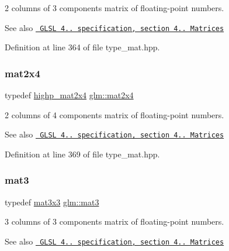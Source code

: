 2 columns of 3 components matrix of floating-\/point numbers.

\begin{DoxySeeAlso}{See also}
\href{http://www.opengl.org/registry/doc/GLSLangSpec.4.20.8.pdf}{\texttt{ G\+L\+SL 4.. specification, section 4.. Matrices}} 
\end{DoxySeeAlso}


Definition at line 364 of file type\+\_\+mat.\+hpp.

\mbox{\label{group__core__types_gaa9bfb36efaf88ecad32369ec8a01d901}} 
\subsubsection{\texorpdfstring{mat2x4}{mat2x4}}
{\footnotesize\ttfamily typedef \mbox{\hyperlink{group__core__precision_ga74ae75c71c8c2b775714fb24454d6096}{highp\+\_\+mat2x4}} \mbox{\hyperlink{group__core__types_gaa9bfb36efaf88ecad32369ec8a01d901}{glm\+::mat2x4}}}

2 columns of 4 components matrix of floating-\/point numbers.

\begin{DoxySeeAlso}{See also}
\href{http://www.opengl.org/registry/doc/GLSLangSpec.4.20.8.pdf}{\texttt{ G\+L\+SL 4.. specification, section 4.. Matrices}} 
\end{DoxySeeAlso}


Definition at line 369 of file type\+\_\+mat.\+hpp.

\mbox{\label{group__core__types_gadfaff2a7dce5cbf4e77a47ecea42ac5b}} 
\subsubsection{\texorpdfstring{mat3}{mat3}}
{\footnotesize\ttfamily typedef \mbox{\hyperlink{group__core__types_ga6fecca6a869070b6bf8acb44ce1c2af3}{mat3x3}} \mbox{\hyperlink{group__core__types_gadfaff2a7dce5cbf4e77a47ecea42ac5b}{glm\+::mat3}}}

3 columns of 3 components matrix of floating-\/point numbers.

\begin{DoxySeeAlso}{See also}
\href{http://www.opengl.org/registry/doc/GLSLangSpec.4.20.8.pdf}{\texttt{ G\+L\+SL 4.. specification, section 4.. Matrices}} 
\end{DoxySeeAlso}


